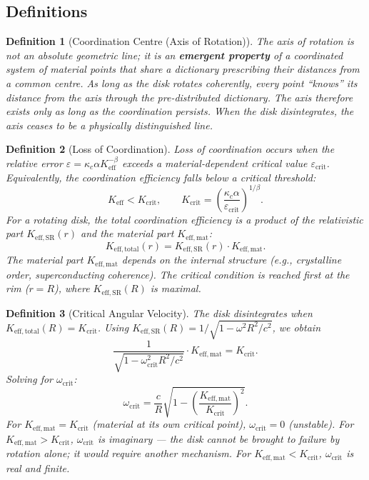 \documentclass[12pt,a4paper]{article}
\newtheorem{definition}{Definition}[section]
\newcommand{\kappac}{\kappa_c}
\newcommand{\betaf}{\beta}
\newcommand{\Keff}{K_{\mathrm{eff}}}
\newcommand{\Keffmat}{K_{\mathrm{eff,mat}}}
\newcommand{\Kefftot}{K_{\mathrm{eff,total}}}
\newcommand{\KeffSR}{K_{\mathrm{eff,SR}}}
\newcommand{\Kcrit}{K_{\mathrm{crit}}}
\begin{document}
	\subsection{Definitions}
	
	\begin{definition}[Coordination Centre (Axis of Rotation)]
		The axis of rotation is not an absolute geometric line; it is an \textbf{emergent property} of a coordinated system of material points that share a dictionary prescribing their distances from a common centre. As long as the disk rotates coherently, every point ``knows'' its distance from the axis through the pre-distributed dictionary. The axis therefore exists only as long as the coordination persists. When the disk disintegrates, the axis ceases to be a physically distinguished line.
	\end{definition}
	
	\begin{definition}[Loss of Coordination]
		Loss of coordination occurs when the relative error \(\varepsilon = \kappac \alpha K_{\mathrm{eff}}^{-\betaf}\) exceeds a material‑dependent critical value \(\varepsilon_{\text{crit}}\). Equivalently, the coordination efficiency falls below a critical threshold:
		\[
		\Keff < \Kcrit, \qquad \Kcrit = \left( \frac{\kappac \alpha}{\varepsilon_{\text{crit}}} \right)^{1/\betaf}.
		\]
		For a rotating disk, the total coordination efficiency is a product of the relativistic part \(K_{\mathrm{eff,SR}}(r)\) and the material part \(K_{\mathrm{eff,mat}}\):
		\[
		\Kefftot(r) = \KeffSR(r) \cdot \Keffmat.
		\]
		The material part \(K_{\mathrm{eff,mat}}\) depends on the internal structure (e.g., crystalline order, superconducting coherence). The critical condition is reached first at the rim (\(r = R\)), where \(\KeffSR(R)\) is maximal.
	\end{definition}
	
	\begin{definition}[Critical Angular Velocity]
		The disk disintegrates when \(\Kefftot(R) = \Kcrit\). Using \(\KeffSR(R) = 1/\sqrt{1 - \omega^2 R^2/c^2}\), we obtain
		\[
		\frac{1}{\sqrt{1 - \omega_{\text{crit}}^2 R^2/c^2}} \cdot \Keffmat = \Kcrit.
		\]
		Solving for \(\omega_{\text{crit}}\):
		\[
		\boxed{\omega_{\text{crit}} = \frac{c}{R} \sqrt{1 - \left( \frac{\Keffmat}{\Kcrit} \right)^2 }}.
		\]
		For \(\Keffmat = \Kcrit\) (material at its own critical point), \(\omega_{\text{crit}} = 0\) (unstable). For \(\Keffmat > \Kcrit\), \(\omega_{\text{crit}}\) is imaginary — the disk cannot be brought to failure by rotation alone; it would require another mechanism. For \(\Keffmat < \Kcrit\), \(\omega_{\text{crit}}\) is real and finite.
	\end{definition}
	
\end{document}
